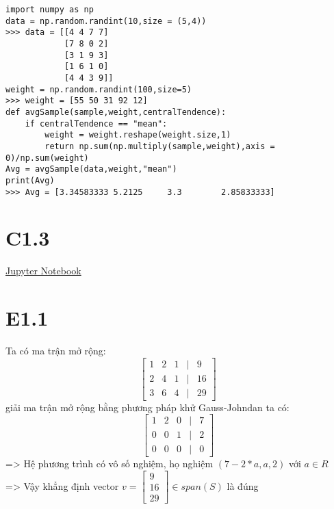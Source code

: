 \documentclass[a4paper,11pt]{article}
\theoremstyle{mytheor}
\begin{document}
\begin{lstlisting}[label={list:first},caption={avgSample(sample,w)}]
import numpy as np
data = np.random.randint(10,size = (5,4))
>>> data = [[4 4 7 7]
            [7 8 0 2]
            [3 1 9 3]
            [1 6 1 0]
            [4 4 3 9]]
weight = np.random.randint(100,size=5)
>>> weight = [55 50 31 92 12]
def avgSample(sample,weight,centralTendence):
    if centralTendence == "mean":
        weight = weight.reshape(weight.size,1)
        return np.sum(np.multiply(sample,weight),axis = 0)/np.sum(weight)
Avg = avgSample(data,weight,"mean")
print(Avg)
>>> Avg = [3.34583333 5.2125     3.3        2.85833333]
\end{lstlisting}

\section*{C1.3}
\href{https://drive.google.com/file/d/1ytqk-ce6TFqLxoQVSYeg_LY-3LncnyKP/view?usp=sharing}{Jupyter Notebook}
\section*{E1.1}
Ta có ma trận mở rộng:
$$
\begin{bmatrix}
     1 & 2 & 1 & | & 9\\
     2 & 4 & 1 & | & 16\\
     3 & 6 & 4 & | & 29
\end{bmatrix}
$$
giải ma trận mở rộng bằng phương pháp khử Gauss-Johndan ta có:
$$
\begin{bmatrix}
     1 & 2 & 0 & | & 7\\
     0 & 0 & 1 & | & 2\\
     0 & 0 & 0 & | & 0
\end{bmatrix}
$$
=> Hệ phương trình có vô số nghiệm, họ nghiệm $(7-2*a,a,2)$ với $a \in R$ \\
=> Vậy khẳng định vector $v = \begin{bmatrix}
    9\\16\\29    
\end{bmatrix} \in span(S) 
$ là đúng
\end{document}
